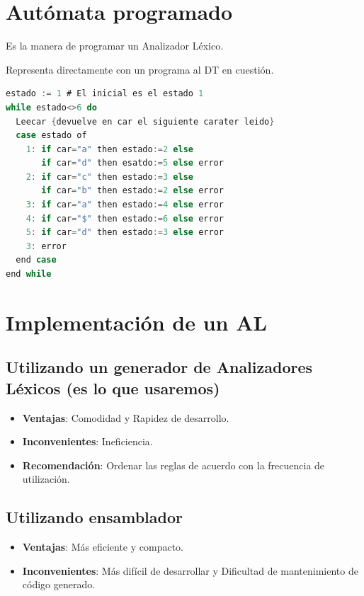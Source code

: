 \documentclass[12pt, twoside, openright]{report} %
\begin{document}
\section{Autómata programado}

Es la manera de programar un Analizador Léxico.

Representa directamente con un programa al DT en cuestión.

\begin{lstlisting}[language=C]
estado := 1 # El inicial es el estado 1
while estado<>6 do
  Leecar {devuelve en car el siguiente carater leido}
  case estado of
    1: if car="a" then estado:=2 else
       if car="d" then esatdo:=5 else error
    2: if car="c" then estado:=3 else
       if car="b" then estado:=2 else error
    3: if car="a" then estado:=4 else error
    4: if car="$" then estado:=6 else error
    5: if car="d" then estado:=3 else error
    3: error
  end case
end while
\end{lstlisting}

\section{Implementación de un AL}

\subsection{Utilizando un generador de Analizadores Léxicos (es lo que usaremos)}

\begin{itemize}
	\item \textbf{Ventajas}: Comodidad y Rapidez de desarrollo.
	\item \textbf{Inconvenientes}: Ineficiencia.
	\item \textbf{Recomendación}: Ordenar las reglas de acuerdo con la frecuencia
	      de utilización.
\end{itemize}


\subsection{Utilizando ensamblador}

\begin{itemize}
	\item \textbf{Ventajas}: Más eficiente y compacto.
	\item \textbf{Inconvenientes}: Más difícil de desarrollar y Dificultad de
	      mantenimiento de código generado.
\end{itemize}
\end{document}
